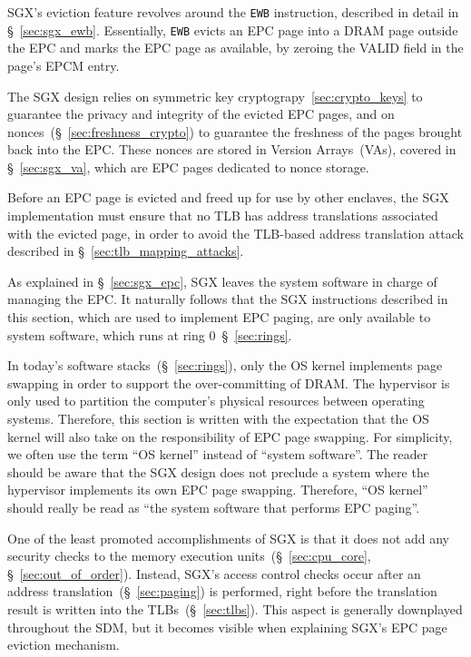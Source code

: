 SGX's eviction feature revolves around the \texttt{EWB} instruction, described
in detail in \S~\ref{sec:sgx_ewb}. Essentially, \texttt{EWB} evicts an EPC page
into a DRAM page outside the EPC and marks the EPC page as available, by
zeroing the VALID field in the page's EPCM entry.

The SGX design relies on symmetric key cryptograpy~\ref{sec:crypto_keys} to
guarantee the privacy and integrity of the evicted EPC pages, and on
nonces~(\S~\ref{sec:freshness_crypto}) to guarantee the freshness of the pages
brought back into the EPC. These nonces are stored in Version Arrays~(VAs),
covered in \S~\ref{sec:sgx_va}, which are EPC pages dedicated to nonce storage.

Before an EPC page is evicted and freed up for use by other enclaves, the SGX
implementation must ensure that no TLB has address translations associated with
the evicted page, in order to avoid the TLB-based address translation attack
described in \S~\ref{sec:tlb_mapping_attacks}.

As explained in \S~\ref{sec:sgx_epc}, SGX leaves the system software in charge
of managing the EPC. It naturally follows that the SGX instructions described
in this section, which are used to implement EPC paging, are only available to
system software, which runs at ring 0~\S~\ref{sec:rings}.

In today's software stacks~(\S~\ref{sec:rings}), only the OS kernel implements
page swapping in order to support the over-committing of DRAM. The hypervisor
is only used to partition the computer's physical resources between operating
systems. Therefore, this section is written with the expectation that the OS
kernel will also take on the responsibility of EPC page swapping. For
simplicity, we often use the term ``OS kernel'' instead of ``system software''.
The reader should be aware that the SGX design does not preclude a system where
the hypervisor implements its own EPC page swapping. Therefore, ``OS kernel''
should really be read as ``the system software that performs EPC paging''.


\label{sec:sgx_eblock}

One of the least promoted accomplishments of SGX is that it does not add any
security checks to the memory execution units~(\S~\ref{sec:cpu_core},
\S~\ref{sec:out_of_order}). Instead, SGX's access control checks occur after an
address translation~(\S~\ref{sec:paging}) is performed, right before the
translation result is written into the TLBs~(\S~\ref{sec:tlbs}). This aspect
is generally downplayed throughout the SDM, but it becomes visible when
explaining SGX's EPC page eviction mechanism.

